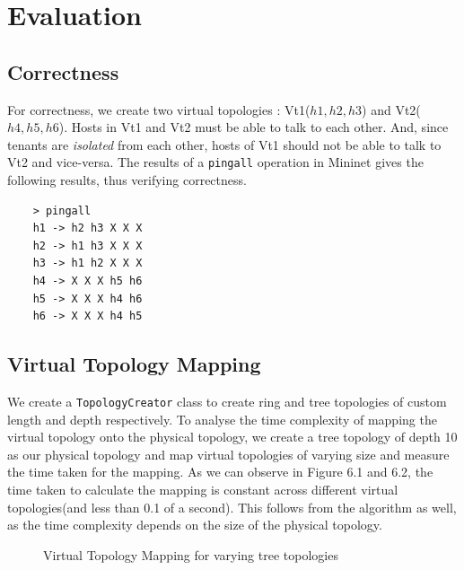 \chapter{Evaluation}
\section{Correctness} 
For correctness, we create two virtual topologies : Vt1($h1,h2,h3$) and Vt2($h4,h5,h6$). Hosts in Vt1 and Vt2 must be able to talk to each other. And, since tenants are \emph{isolated} from each other, hosts of Vt1 should not be able to talk to Vt2 and vice-versa. The results of a \verb|pingall| operation in Mininet gives the following results, thus verifying correctness.
\begin{verbatim}
	> pingall
	h1 -> h2 h3 X X X
	h2 -> h1 h3 X X X
	h3 -> h1 h2 X X X
	h4 -> X X X h5 h6
	h5 -> X X X h4 h6
	h6 -> X X X h4 h5
\end{verbatim}
\section{Virtual Topology Mapping}
We create a \verb|TopologyCreator| class to create ring and tree topologies of custom length and depth respectively. To analyse the time complexity of mapping the virtual topology onto the physical topology, we create a tree topology of depth 10 as our physical topology and map virtual topologies of varying size and measure the time taken for the mapping. As we can observe in Figure 6.1 and 6.2, the time taken to calculate the mapping is constant across different virtual topologies(and less than 0.1 of a second). This follows from the algorithm as well, as the time complexity depends on the size of the physical topology.
\begin{figure}
	\noindent
	\caption{Virtual Topology Mapping for varying tree topologies}
\end{figure}


